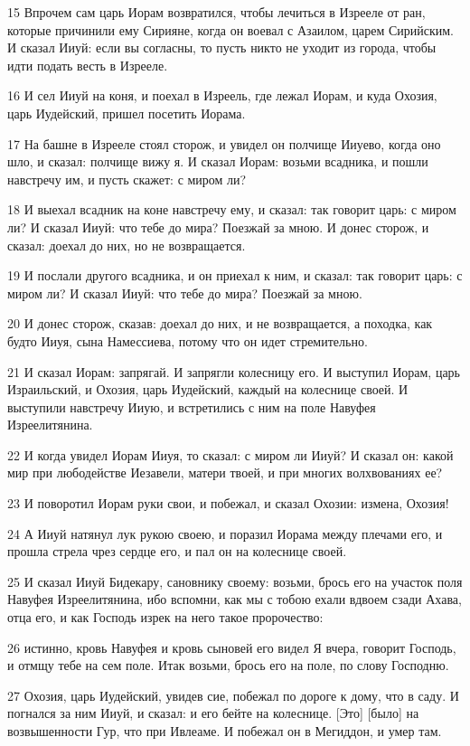 \par 15 Впрочем сам царь Иорам возвратился, чтобы лечиться в Изрееле от ран, которые причинили ему Сирияне, когда он воевал с Азаилом, царем Сирийским. И сказал Ииуй: если вы согласны, то пусть никто не уходит из города, чтобы идти подать весть в Изрееле.
\par 16 И сел Ииуй на коня, и поехал в Изреель, где лежал Иорам, и куда Охозия, царь Иудейский, пришел посетить Иорама.
\par 17 На башне в Изрееле стоял сторож, и увидел он полчище Ииуево, когда оно шло, и сказал: полчище вижу я. И сказал Иорам: возьми всадника, и пошли навстречу им, и пусть скажет: с миром ли?
\par 18 И выехал всадник на коне навстречу ему, и сказал: так говорит царь: с миром ли? И сказал Ииуй: что тебе до мира? Поезжай за мною. И донес сторож, и сказал: доехал до них, но не возвращается.
\par 19 И послали другого всадника, и он приехал к ним, и сказал: так говорит царь: с миром ли? И сказал Ииуй: что тебе до мира? Поезжай за мною.
\par 20 И донес сторож, сказав: доехал до них, и не возвращается, а походка, как будто Ииуя, сына Намессиева, потому что он идет стремительно.
\par 21 И сказал Иорам: запрягай. И запрягли колесницу его. И выступил Иорам, царь Израильский, и Охозия, царь Иудейский, каждый на колеснице своей. И выступили навстречу Ииую, и встретились с ним на поле Навуфея Изреелитянина.
\par 22 И когда увидел Иорам Ииуя, то сказал: с миром ли Ииуй? И сказал он: какой мир при любодействе Иезавели, матери твоей, и при многих волхвованиях ее?
\par 23 И поворотил Иорам руки свои, и побежал, и сказал Охозии: измена, Охозия!
\par 24 А Ииуй натянул лук рукою своею, и поразил Иорама между плечами его, и прошла стрела чрез сердце его, и пал он на колеснице своей.
\par 25 И сказал Ииуй Бидекару, сановнику своему: возьми, брось его на участок поля Навуфея Изреелитянина, ибо вспомни, как мы с тобою ехали вдвоем сзади Ахава, отца его, и как Господь изрек на него такое пророчество:
\par 26 истинно, кровь Навуфея и кровь сыновей его видел Я вчера, говорит Господь, и отмщу тебе на сем поле. Итак возьми, брось его на поле, по слову Господню.
\par 27 Охозия, царь Иудейский, увидев сие, побежал по дороге к дому, что в саду. И погнался за ним Ииуй, и сказал: и его бейте на колеснице. [Это] [было] на возвышенности Гур, что при Ивлеаме. И побежал он в Мегиддон, и умер там.

